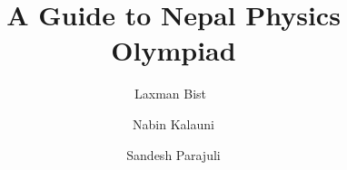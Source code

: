 \documentclass[a4paper, 12pt, twoside]{book}
\begin{document}
\frontmatter


\pagestyle{empty}
\title{\textbf{A Guide to Nepal Physics Olympiad}}
\author{
   Laxman Bist\
   \and
   Nabin Kalauni\\
   \and
   Sandesh Parajuli\\
}
\date{}
\maketitle



\pagestyle{plain}


\tableofcontents

\mainmatter



% 





\end{document}
